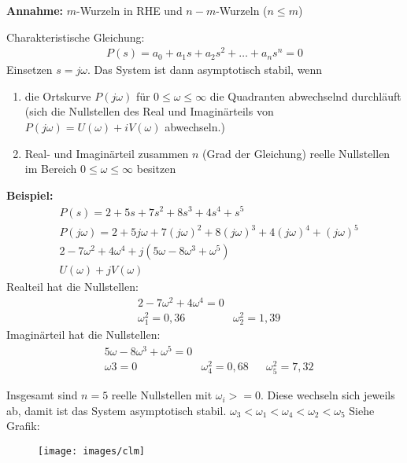 \begin{tcolorbox}[colback=white!10!white,colframe=green!30!black,title=CLM Kriterium] 
    \textbf{Annahme:}
    $m$-Wurzeln in RHE  und $n-m$-Wurzeln ($n \leq m$)
    
    Charakteristische Gleichung:
    \begin{align*}
        P(s) = a_0 + a_1s + a_2s^2 + \ldots + a_n s^n = 0 
    \end{align*}
    Einsetzen $s = j\omega$. 
    Das System ist dann asymptotisch stabil, wenn
    \begin{enumerate}
        \item die Ortskurve $P(j\omega)$  für $0 \leq \omega \leq \infty$ die Quadranten abwechselnd durchläuft (sich die Nullstellen des Real und Imaginärteils von $P(j\omega) = U(\omega)+iV(\omega)$ abwechseln.) 
        \item Real- und Imaginärteil zusammen $n$ (Grad der Gleichung) reelle Nullstellen im Bereich $0 \leq \omega \leq \infty$ besitzen 
    \end{enumerate} 
    
    
    
    
    \tcblower
    
    \textbf{Beispiel:}
    \begin{align*}
        &P(s) = 2 + 5s +7s^2 +8s^3 +4s^4 +s^5\\
        &P(j\omega) = 2 + 5j\omega + 7(j\omega)^2 +8 (j\omega)^3 + 4 (j\omega)^4 + (j\omega)^5\\
        &2-7\omega^2 +4\omega^4 + j (5\omega - 8\omega^3 +\omega^5)\\
        &U(\omega) + jV(\omega)
    \end{align*}
    Realteil hat die Nullstellen:
    \begin{align*}
        &2-7\omega^2 +4\omega^4 = 0 \\
        &\omega_1^2 = 0,36 & \omega_2^2= 1,39
    \end{align*}
        Imaginärteil hat die Nullstellen:
        \begin{align*}
        &5\omega - 8\omega^3 +\omega^5= 0 \\
        &\omega3 = 0  & \omega_4^2= 0,68 & & \omega_5^2= 7,32 
        \end{align*}
        
        Insgesamt sind $n=5$ reelle Nullstellen mit $\omega_i >= 0$. Diese wechseln sich jeweils ab, damit ist das System asymptotisch stabil. $\omega_3 < \omega_1 < \omega_4 < \omega_2 < \omega_5$ Siehe Grafik:
        \begin{figure}[H]
\centering
\texttt{[image: images/clm]}
\label{fig:clm}
\end{figure}

        
\end{tcolorbox}
